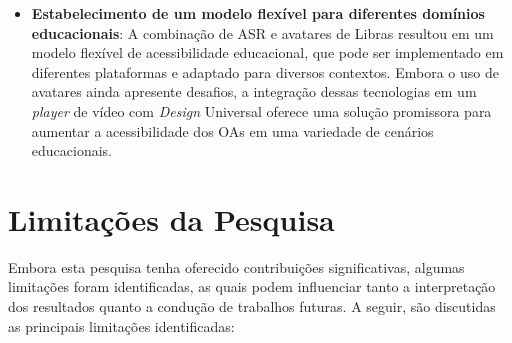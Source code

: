 \begin{itemize}
    \item \textbf{Estabelecimento de um modelo flexível para diferentes domínios educacionais}: A combinação de ASR e avatares de Libras resultou em um modelo flexível de acessibilidade educacional, que pode ser implementado em diferentes plataformas e adaptado para diversos contextos. Embora o uso de avatares ainda apresente desafios, a integração dessas tecnologias em um \textit{player} de vídeo com \textit{Design} Universal oferece uma solução promissora para aumentar a acessibilidade dos OAs em uma variedade de cenários educacionais.
\end{itemize}

\section{Limitações da Pesquisa}

Embora esta pesquisa tenha oferecido contribuições significativas, algumas limitações foram identificadas, as quais podem influenciar tanto a interpretação dos resultados quanto a condução de trabalhos futuras. A seguir, são discutidas as principais limitações identificadas:

